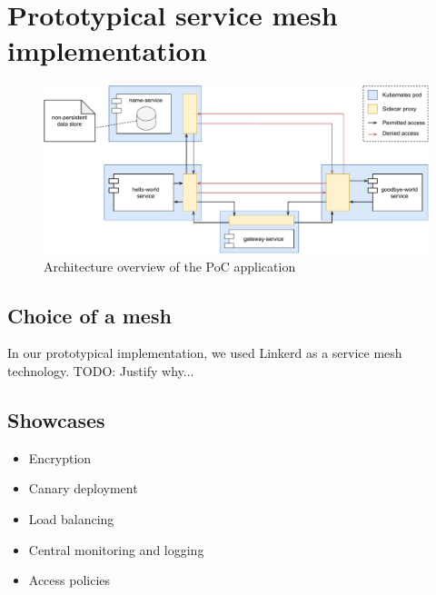 \section{Prototypical service mesh implementation}

\begin{figure}
    \centering
    \includegraphics[width=\textwidth]{img/diagram-draft.pdf}
    \caption{Architecture overview of the PoC application}
    \label{fig:poc-overview}
\end{figure}

\subsection{Choice of a mesh}

In our prototypical implementation, we used Linkerd as a service mesh technology. TODO: Justify why...

\subsection{Showcases}

\begin{itemize}
    \item Encryption
    \item Canary deployment
    \item Load balancing
    \item Central monitoring and logging
    \item Access policies
\end{itemize}
